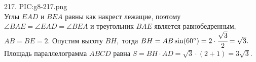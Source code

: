 217. {{PIC:g8-217.png}}\\
Углы $EAD$ и $BEA$ равны как накрест лежащие, поэтому $\angle BAE=\angle EAD=\angle BEA$ и треугольник $BAE$ является равнобедренным, $AB=BE=2.$ Опустим высоту $BH,$ тогда $BH=AB\sin(60^\circ)=2\cdot\cfrac{\sqrt{3}}{2}=\sqrt{3}.$ Площадь параллелограмма $ABCD$ равна $S=BH\cdot AD=\sqrt{3}\cdot(2+1)=3\sqrt{3}.$\\
